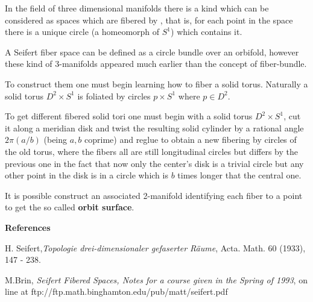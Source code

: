 \documentclass[12pt]{article}
\begin{document}
In the field of three dimensional manifolds there is a kind which can be considered as spaces which are fibered by
, that is, for each point in the space there is a unique circle (a homeomorph of $S^1$) which contains it.

A Seifert fiber space can be defined as a circle bundle over an orbifold,
however these kind of 3-manifolds appeared much earlier than the concept of fiber-bundle.

To construct them one must begin learning how to fiber a solid torus. 
Naturally a solid torus $D^2\times S^1$ is foliated by circles $p\times S^1$ where $p\in D^2$.

To get different fibered solid tori one must begin with a solid torus $D^2\times S^1$, cut it along a meridian disk and twist the resulting solid cylinder by a rational angle $2\pi(a/b)$ (being $a,b$ coprime) and reglue to obtain a new fibering by circles of the old torus, where the fibers all are still longitudinal circles but differs by the previous one in the fact that now only the center's disk is a trivial circle but any other point in the disk is in a circle which is $b$ times longer that the central one.

\bigskip

It is possible construct an associated 2-manifold identifying each fiber to a point to get the so called {\bf orbit surface}.


\bigskip


{\bf References}

H. Seifert,{\it Topologie drei-dimensionaler gefaserter R\"aume}, Acta. Math. 60 (1933), 147 - 238.

M.Brin, {\it  Seifert Fibered Spaces, Notes for a course given in the Spring of 1993}, on line at
ftp://ftp.math.binghamton.edu/pub/matt/seifert.pdf
\end{document}
